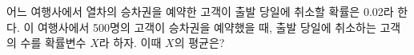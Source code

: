 어느 여행사에서 열차의 승차권을 예약한 고객이 출발 당일에 취소할 확률은 0.02라 한다. 이 여행사에서 500명의 고객이 승차권을 예약했을 때, 출발 당일에 취소하는 고객의 수를 확률변수 $X$라 하자. 이때 $X$의 평균은? 
